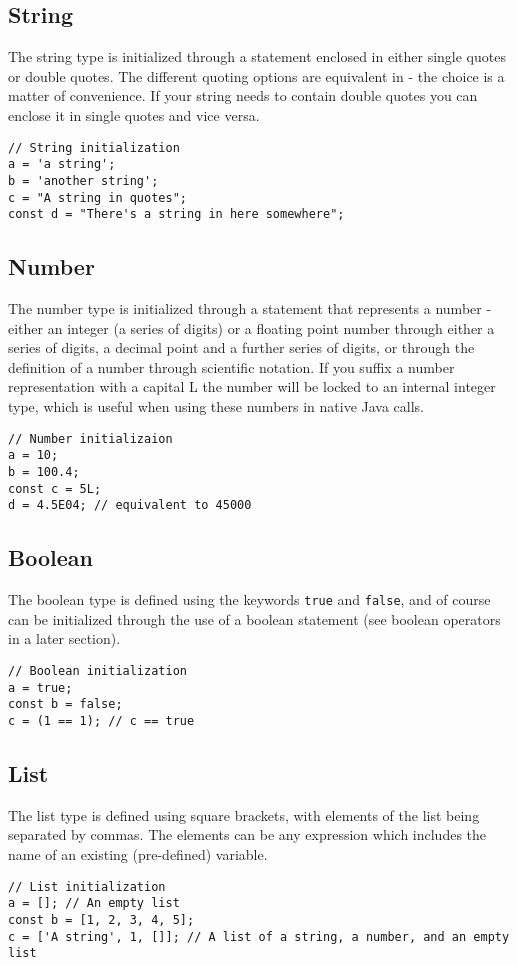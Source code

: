 \subsection{String}
The string type is initialized through a statement enclosed in either single quotes or double quotes. The different quoting options are equivalent in \Reflex - the choice is a matter of convenience. If your string needs to contain double quotes you can enclose it in single quotes and vice versa.
\begin{lstlisting}[caption={String initialization}]
// String initialization
a = 'a string';
b = 'another string';
c = "A string in quotes";
const d = "There's a string in here somewhere";
\end{lstlisting}

\subsection{Number}
The number  type is initialized through a statement that represents a number - either an integer (a series of digits) or a floating point number through either a series of digits, a decimal point and a further series of digits, or through the definition of a number through scientific notation. If you suffix a number representation with a capital L the number will be locked to an internal integer  type, which is useful when using these numbers in native Java calls.
\begin{lstlisting}[caption={Number initialization}]
// Number initializaion
a = 10;
b = 100.4;
const c = 5L;
d = 4.5E04; // equivalent to 45000
\end{lstlisting}
\subsection{Boolean}
The boolean  type is defined using the keywords \Verb+true+ and \verb+false+, and of course can be initialized through the use of a boolean statement (see boolean operators in a later section).
\begin{lstlisting}[caption={Boolean initialization}]
// Boolean initialization
a = true;
const b = false;
c = (1 == 1); // c == true
\end{lstlisting}
\subsection{List}
The list  type is defined using square brackets, with elements of the list being separated by commas. The elements can be any expression which includes the name of an existing (pre-defined) variable.
\begin{lstlisting}[caption={List initialization}]
// List initialization
a = []; // An empty list
const b = [1, 2, 3, 4, 5]; 
c = ['A string', 1, []]; // A list of a string, a number, and an empty list
\end{lstlisting}
